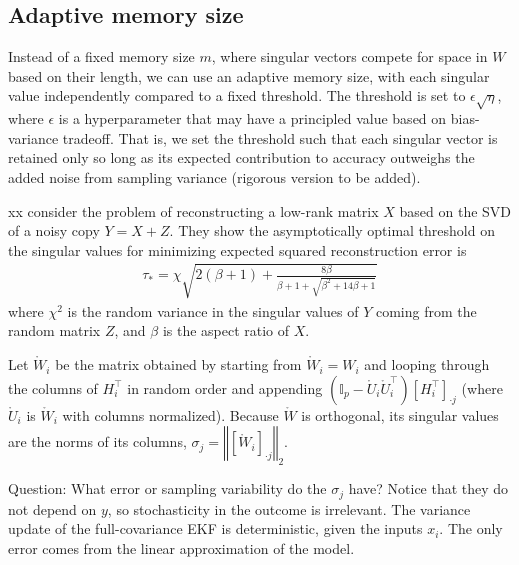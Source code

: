 \subsection{Adaptive memory size}

Instead of a fixed memory size $m$, where singular vectors compete for space in $W$ based on their length, we can use an adaptive memory size, with each singular value independently compared to a fixed threshold. The threshold is set to $\epsilon\sqrt{\eta}$, where $\epsilon$ is a hyperparameter that may have a principled value based on bias-variance tradeoff. That is, we set the threshold such that each singular vector is retained only so long as its expected contribution to accuracy outweighs the added noise from sampling variance (rigorous version to be added).

xx consider the problem of reconstructing a low-rank matrix $X$ based on the SVD of a noisy copy $Y=X+Z$. They show the asymptotically optimal threshold on the singular values for minimizing expected squared reconstruction error is 
\begin{align}
    \tau_* = \chi\sqrt{2(\beta+1)+\frac{8\beta}{\beta+1+\sqrt{\beta^2+14\beta+1}}}
\end{align}
where $\chi^2$ is the random variance in the singular values of $Y$ coming from the random matrix $Z$, and $\beta$ is the aspect ratio of $X$.

Let $\ring{W}_i$ be the matrix obtained by starting from $\ring{W}_i=W_i$ and looping through the columns of $H_i^{\top}$ in random order and appending $(\mathbb{I}_p-\ring{U}_i\ring{U}_i^{\top})\left[H_i^{\top}\right]_{\cdot j}$ (where $\ring{U}_i$ is $\ring{W}_i$ with columns normalized). Because $\ring{W}$ is orthogonal, its singular values are the norms of its columns, $\sigma_j = \left\Vert\left[\ring{W}_i\right]_{\cdot j}\right\Vert_2$. 

Question: What error or sampling variability do the $\sigma_j$ have? Notice that they do not depend on $y$, so stochasticity in the outcome is irrelevant. The variance update of the full-covariance EKF is deterministic, given the inputs $x_i$. The only error comes from the linear approximation of the model. 

